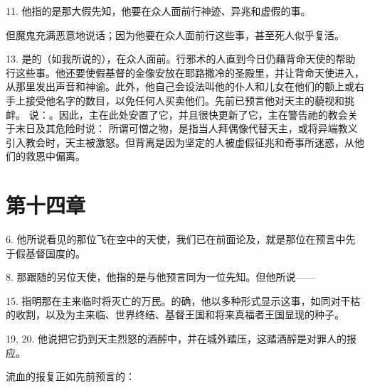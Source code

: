 11.  他指的是那大假先知，他要在众人面前行神迹、异兆和虚假的事。\par

 但魔鬼充满恶意地说话；因为他要在众人面前行这些事，甚至死人似乎复活。\par

13.  是的（如我所说的），在众人面前。行邪术的人直到今日仍藉背命天使的帮助行这些事。他还要使假基督的金像安放在耶路撒冷的圣殿里，并让背命天使进入，从那里发出声音和神谕。此外，他自己会设法叫他的仆人和儿女在他们的额上或右手上接受他名字的数目，以免任何人买卖他们。先前已预言他对天主的藐视和挑衅。 说：。因此，主在此处安置了它，并且很快更新了它，主在警告祂的教会关于末日及其危险时说：  所谓可憎之物，是指当人拜偶像代替天主，或将异端教义引入教会时，天主被激怒。但背离是因为坚定的人被虚假征兆和奇事所迷惑，从他们的救恩中偏离。\par


\section{第十四章}

6.  他所说看见的那位飞在空中的天使，我们已在前面论及，就是那位在预言中先于假基督国度的。\par

8.  那跟随的另位天使，他指的是与他预言同为一位先知。但他所说——\par

15.  指明那在主来临时将灭亡的万民。的确，他以多种形式显示这事，如同对干枯的收割，以及为主来临、世界终结、基督王国和将来真福者王国显现的种子。\par

19, 20.  他说把它扔到天主烈怒的酒醡中，并在城外踏压，这踏酒醡是对罪人的报应。\par

 流血的报复正如先前预言的：\par

